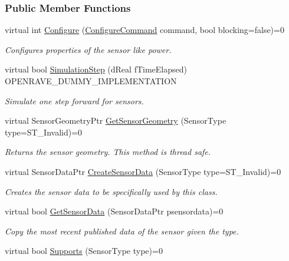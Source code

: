 \subsubsection*{Public Member Functions}
\begin{DoxyCompactItemize}
\item 
virtual int \hyperlink{classOpenRAVE_1_1SensorBase_ae02c7c4987dd11f5fb7657e18c7c8318}{Configure} (\hyperlink{classOpenRAVE_1_1SensorBase_a48dea54d66d3cd48fda033d19cad7dbc}{ConfigureCommand} command, bool blocking=false)=0
\begin{DoxyCompactList}\small\item\em Configures properties of the sensor like power. \item\end{DoxyCompactList}\item 
virtual bool \hyperlink{classOpenRAVE_1_1SensorBase_afa04259a5131e4b12c964d7c66d7c89a}{SimulationStep} (dReal fTimeElapsed) OPENRAVE\_\-DUMMY\_\-IMPLEMENTATION
\begin{DoxyCompactList}\small\item\em Simulate one step forward for sensors. \item\end{DoxyCompactList}\item 
virtual SensorGeometryPtr \hyperlink{classOpenRAVE_1_1SensorBase_a080408b00865d76ab0890ae98207d980}{GetSensorGeometry} (SensorType type=ST\_\-Invalid)=0
\begin{DoxyCompactList}\small\item\em Returns the sensor geometry. This method is thread safe. \item\end{DoxyCompactList}\item 
virtual SensorDataPtr \hyperlink{classOpenRAVE_1_1SensorBase_ae4531cd4b3e1de9708d9fc2cce769eff}{CreateSensorData} (SensorType type=ST\_\-Invalid)=0
\begin{DoxyCompactList}\small\item\em Creates the sensor data to be specifically used by this class. \item\end{DoxyCompactList}\item 
virtual bool \hyperlink{classOpenRAVE_1_1SensorBase_ad7b2e5f8884dd4897de003828e8e8146}{GetSensorData} (SensorDataPtr psensordata)=0
\begin{DoxyCompactList}\small\item\em Copy the most recent published data of the sensor given the type. \item\end{DoxyCompactList}\item 
\hypertarget{classOpenRAVE_1_1SensorBase_a3d9771c99399198411c3715160d7d415}{
virtual bool \hyperlink{classOpenRAVE_1_1SensorBase_a3d9771c99399198411c3715160d7d415}{Supports} (SensorType type)=0}
\label{classOpenRAVE_1_1SensorBase_a3d9771c99399198411c3715160d7d415}


\end{DoxyCompactItemize}
